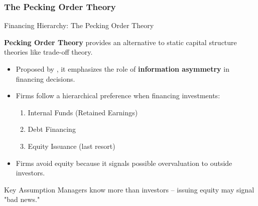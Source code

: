 \subsubsection{The Pecking Order Theory}
\begin{frame}{Financing Hierarchy: The Pecking Order Theory}
	
	\textbf{Pecking Order Theory} provides an alternative to static capital structure theories like trade-off theory.
	
	\begin{itemize}
		\item Proposed by \textcite{myers1984corporate}, it emphasizes the role of \textbf{information asymmetry} in financing decisions.
		\item Firms follow a hierarchical preference when financing investments:
		\begin{enumerate}
			\item Internal Funds (Retained Earnings)
			\item Debt Financing
			\item Equity Issuance (last resort)
		\end{enumerate}
		\item Firms avoid equity because it signals possible overvaluation to outside investors.
	\end{itemize}
	
	\vspace{0.2cm}
	\begin{alertblock}{Key Assumption}
		Managers know more than investors -- issuing equity may signal "bad news."
	\end{alertblock}
	
\end{frame}


